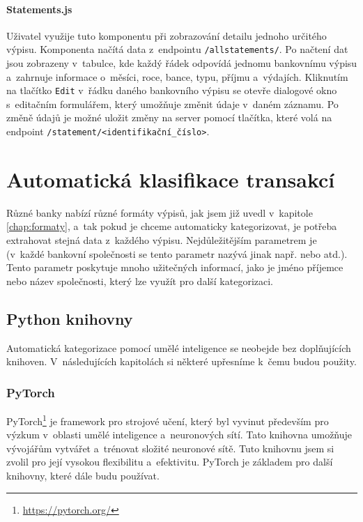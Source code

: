 \subsubsection{Statements.js}
Uživatel využije tuto komponentu při zobrazování detailu jednoho určitého výpisu. Komponenta načítá data z~endpointu \texttt{/allstatements/}. Po načtení dat jsou zobrazeny v~tabulce, kde každý řádek odpovídá jednomu bankovnímu výpisu a~zahrnuje informace o~měsíci, roce, bance, typu, příjmu a~výdajích. Kliknutím na tlačítko \texttt{Edit} v~řádku daného bankovního výpisu se otevře dialogové okno s~editačním formulářem, který umožňuje změnit údaje v~daném záznamu. Po změně údajů je možné uložit změny na server pomocí tlačítka, které volá na endpoint \texttt{/statement/<identifikační\_číslo>}.




\chapter{Automatická klasifikace transakcí}
Různé banky nabízí různé formáty výpisů, jak jsem již uvedl v~kapitole \ref{chap:formaty}, a~tak pokud je chceme automaticky kategorizovat, je potřeba extrahovat stejná data z~každého výpisu. Nejdůležitějším parametrem je  (v~každé bankovní společnosti se tento parametr nazývá jinak např.  nebo  atd.). Tento parametr poskytuje mnoho užitečných informací, jako je jméno příjemce nebo název společnosti, který lze využít pro další kategorizaci.

\section{Python knihovny}
Automatická kategorizace pomocí umělé inteligence se neobejde bez doplňujících knihoven. V~následujících kapitolách si některé upřesníme k~čemu budou použity.
\subsection{PyTorch}
PyTorch\footnote{\url{https://pytorch.org/}} je framework pro strojové učení, který byl vyvinut především pro výzkum v~oblasti umělé inteligence a~neuronových sítí. Tato knihovna umožňuje vývojářům vytvářet a~trénovat složité neuronové sítě. Tuto knihovnu jsem si zvolil pro její vysokou flexibilitu a~efektivitu. PyTorch je základem pro další knihovny, které dále budu používat.


